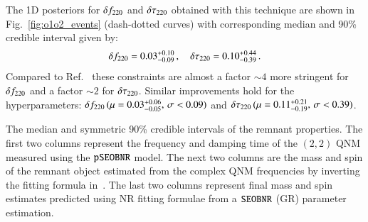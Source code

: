 The 1D posteriors for $\delta f_{\text{220}}$ and $ \delta \tau_{\text{220}}$ obtained with this technique are shown in Fig.~\ref{fig:o1o2_events} (dash-dotted curves) with corresponding median and 90\% credible interval given by: 
%
\begin{equation}
\delta f_{\text{220}}=0.03^{+0.10}_{-0.09}\,,\quad \delta \tau_{\text{220}}=0.10^{+0.44}_{-0.39}\,.
\end{equation}
Compared to Ref.~\cite{Abbott:2020jks} these constraints are almost a factor $\sim 4$ more stringent for $\delta f_{\text{220}}$ and a factor $\sim 2$ for $\delta \tau_{\text{220}}$. Similar improvements hold for the hyperparameters: $\delta f_{\text{220}}\,(\mu=0.03^{+0.06}_{-0.05},\,\sigma<0.09)$ and $\delta \tau_{\text{220}}\,(\mu=0.11^{+0.21}_{-0.19},\,\sigma<0.39)$.


\begin{table}

\caption{The median and symmetric 90\% credible intervals of the remnant properties. The first two columns represent the frequency and damping time of the $(2,2)$ QNM measured using the $\texttt{pSEOBNR}$ model. The next two columns are the mass and spin of the remnant object estimated from the complex QNM frequencies by inverting the fitting formula in~\cite{Berti:2005ys}. The last two columns represent final mass and spin estimates predicted using NR fitting formulae from a $\texttt{SEOBNR}$ (GR) parameter estimation.}
\label{tab:qnm_o1o2_results}
\end{table}

